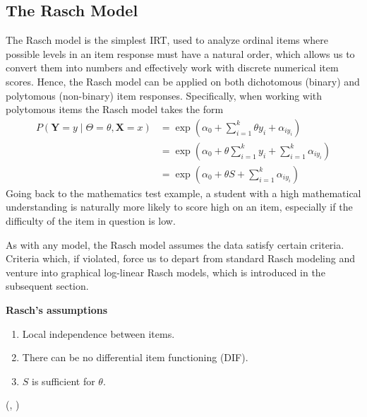 \documentclass[a4project,12pt]{article}
\theoremstyle{examplestyle}
\theoremstyle{defstyle}
\theoremstyle{thmstyle}
\begin{document}
\subsection{The Rasch Model}

The Rasch model is the simplest IRT, used to analyze ordinal items where possible levels in an item response must have a natural order, which allows us to convert them into numbers and effectively work with discrete numerical item scores. Hence, the Rasch model can be applied on both dichotomous (binary) and polytomous (non-binary) item responses. Specifically, when working with polytomous items the Rasch model takes the form
\begin{align}
    P(\mathbf{Y}=y\mid \Theta = \theta, \mathbf{X}=x) &= \exp\left(\alpha_0+\sum_{i=1}^k\theta y_i+\alpha_{iy_i}\right) 
    \\ &= \exp\left(\alpha_0+\theta\sum_{i=1}^k y_i+\sum_{i=1}^k\alpha_{iy_i}\right) \\ &= \exp\left(\alpha_0+\theta S+\sum_{i=1}^k\alpha_{iy_i}\right) \label{eq:sufficient}
\end{align}
Going back to the mathematics test example, a student with a high mathematical understanding is naturally more likely to score high on an item, especially if the difficulty of the item in question is low. 

As with any model, the Rasch model assumes the data satisfy certain criteria. Criteria which, if violated, force us to depart from standard Rasch modeling and venture into graphical log-linear Rasch models, which is introduced in the subsequent section.
\begin{mybox2} 
\textbf{Rasch's assumptions}
\begin{enumerate}
    \item Local independence between items.
    \item There can be no differential item functioning (DIF).
    \item $S$ is sufficient for $\theta$.
\end{enumerate}
\end{mybox2}
(\cite{rasch1960}, \cite{fischer1995rasch})


\end{document}
